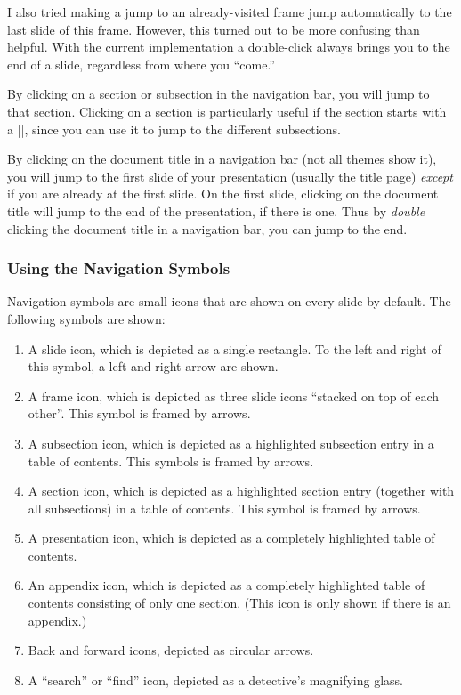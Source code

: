 I also tried making a jump to an already-visited frame jump
automatically to the last slide of this frame. However, this turned
out to be more confusing than helpful. With the current implementation
a double-click always brings you to the end of a slide, regardless
from where you ``come.''

By clicking on a section or subsection in the navigation bar, you will
jump to that section. Clicking on a section is particularly useful if
the section starts with a |\tableofcontents[currentsection]|, since you
can use it to jump to the different subsections.

By clicking on the document title in a navigation bar (not all themes
show it), you will jump to the first slide of your presentation
(usually the title page) \emph{except} if you are already at the first
slide. On the first slide, clicking on the document title will jump to
the end of the presentation, if there is one. Thus by \emph{double}
clicking the document title in a navigation bar, you can jump to the end.



\subsubsection{Using the Navigation Symbols}
\label{section-navigation-symbols}

Navigation symbols are small icons that are shown on every slide
by default. The following symbols are shown: 
\begin{enumerate}
\item
  A slide icon, which is depicted as  a single rectangle. To the left and
  right of this symbol, a left and right arrow are shown.
\item
  A frame icon, which is depicted as three slide icons ``stacked on top of
  each other''. This symbol is framed by arrows.
\item
  A subsection icon, which is depicted as a highlighted subsection
  entry in a table of contents. This  symbols is framed by arrows.
\item
  A section icon, which is depicted as a highlighted section entry
  (together with all subsections) in a table of contents. This symbol
  is framed by arrows.
\item
  A presentation icon, which is depicted as a completely highlighted
  table of contents.
\item
  An appendix icon, which is depicted as a completely highlighted
  table of contents consisting of only one section. (This icon is only
  shown if there is an appendix.)
\item
  Back and forward icons, depicted as circular arrows.
\item
  A ``search'' or ``find'' icon, depicted as a detective's
  magnifying glass.
\end{enumerate}

